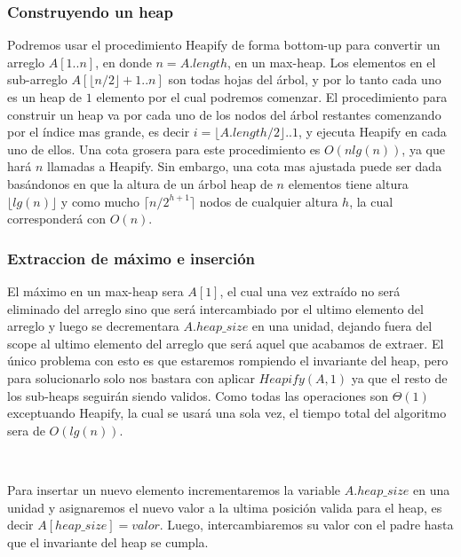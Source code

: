 \documentclass[10pt, a4paper]{report}
\begin{document}
\subsubsection{Construyendo un heap}

Podremos usar el procedimiento Heapify de forma bottom-up para convertir un arreglo $A[1..n]$, en donde $n=A.length$, en un max-heap. Los elementos en el sub-arreglo $A[\lfloor n/2\rfloor + 1 .. n]$ son todas hojas del \'arbol, y por lo tanto cada uno es un heap de $1$ elemento por el cual podremos comenzar. El procedimiento para construir un heap va por cada uno de los nodos del \'arbol restantes comenzando por el \'indice mas grande, es decir $i = \lfloor A.length/2 \rfloor .. 1$, y ejecuta Heapify en cada uno de ellos. Una cota grosera para este procedimiento es $O(nlg(n))$, ya que har\'a $n$ llamadas a Heapify. Sin embargo, una cota mas ajustada puede ser dada bas\'andonos en que la altura de un \'arbol heap de $n$ elementos tiene altura $\lfloor lg(n) \rfloor$ y como mucho $\lceil n/2^{h+1}\rceil$ nodos de cualquier altura $h$, la cual corresponder\'a con $O(n)$.


\subsubsection{Extraccion de m\'aximo e inserci\'on}

El m\'aximo en un max-heap sera $A[1]$, el cual una vez extra\'ido no ser\'a eliminado del arreglo sino que ser\'a intercambiado por el ultimo elemento del arreglo y luego se decrementara $A.heap\_size$ en una unidad, dejando fuera del scope al ultimo elemento del arreglo que ser\'a aquel que acabamos de extraer. El \'unico problema con esto es que estaremos rompiendo el invariante del heap, pero para solucionarlo solo nos bastara con aplicar $Heapify(A,1)$ ya que el resto de los sub-heaps seguir\'an siendo validos. Como todas las operaciones son $\Theta(1)$ exceptuando Heapify, la cual se usar\'a una sola vez, el tiempo total del algoritmo sera de $O(lg(n))$.


~

Para insertar un nuevo elemento incrementaremos la variable $A.heap\_size$ en una unidad y asignaremos el nuevo valor a la ultima posici\'on valida para el heap, es decir $A[heap\_size] = valor$. Luego, intercambiaremos su valor con el padre hasta que el invariante del heap se cumpla.
\end{document}
